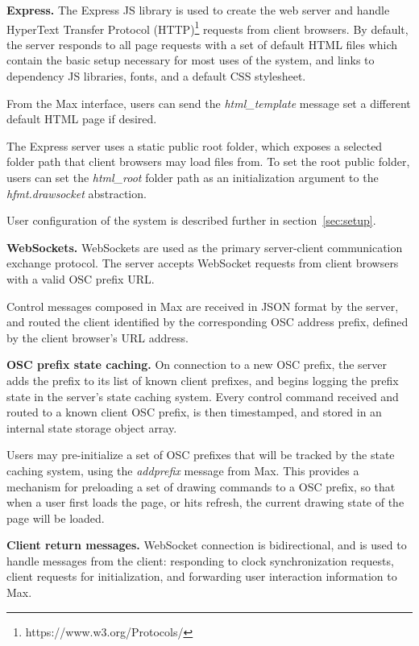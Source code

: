\medskip
\noindent
\textbf{Express.}
The Express JS library is used to create the web server and handle HyperText Transfer Protocol (HTTP)\footnote{https://www.w3.org/Protocols/} requests from client browsers. 
By default, the server responds to all page requests with a set of default HTML files which contain the basic setup necessary for most uses of the \drawsocket system, and links to dependency JS libraries, fonts, and a default CSS stylesheet.

From the Max interface, users can send the \textit{html\_template} message set a different default HTML page if desired.

The Express server uses a static public root folder, which exposes a selected folder path that client browsers may load files from. 
To set the root public folder, users can set the \textit{html\_root} folder path as an initialization argument to the \textit{hfmt.drawsocket} abstraction.

User configuration of the system is described further in section~\ref{sec:setup}.

\medskip
\noindent
\textbf{WebSockets.}
WebSockets are used as the primary server-client communication exchange protocol.
The server accepts WebSocket requests from client browsers with a valid OSC prefix URL.

Control messages composed in Max are received in JSON format by the server, and routed the client identified by the corresponding OSC address prefix, defined by the client browser's URL address.

\medskip
\noindent
\textbf{OSC prefix state caching.}
On connection to a new OSC prefix, the server adds the prefix to its list of known client prefixes, and begins logging the prefix state in the server's state caching system. 
Every control command received and routed to a known client OSC prefix, is then timestamped, and stored in an internal state storage object array.

Users may pre-initialize a set of OSC prefixes that will be tracked by the state caching system, using the \textit{addprefix} message from Max.
This provides a mechanism for preloading a set of drawing commands to a OSC prefix, so that when a user first loads the page, or hits refresh, the current drawing state of the page will be loaded.

\medskip
\noindent
\textbf{Client return messages.}
WebSocket connection is bidirectional, and is used to handle messages from the client: responding to clock synchronization requests, client requests for initialization, and forwarding user interaction information to Max.

